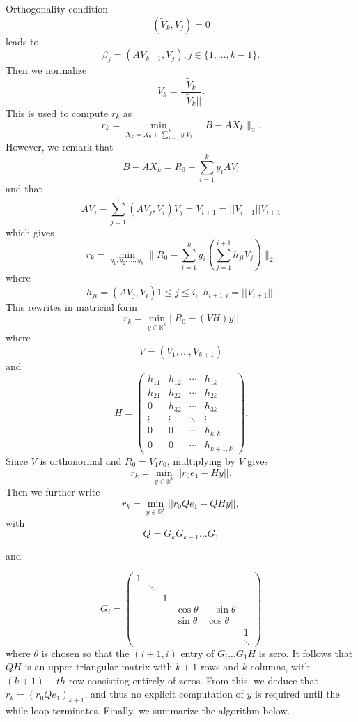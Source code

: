 \documentclass[final,1p,times]{elsarticle}
\newcommand{\R}{\mathbb{R}}
\begin{document}
Orthogonality condition
\[(\tilde{V}_k,V_j)=0\]
leads to
\[\beta_j=(AV_{k-1},V_j), j\in\{1,...,k-1\}.\]
Then we normalize 
\[V_k=\frac{\tilde{V}_k}{||\tilde{V}_k||}.\]
This is used to compute $r_k$ as 
\[r_k = \min_{X_k=X_0+\sum_{i=1}^ky_iV_i} \| B - AX_k \|_2. \]
However, we remark that
\[B - AX_k=R_0-\sum_{i=1}^ky_iAV_i\]
and that
\[AV_i-\sum_{j=1}^i(AV_j,V_i)V_j=\tilde{V}_{i+1}=||\tilde{V}_{i+1}||V_{i+1}\]
which gives
\[r_k=\min_{y_1,y_2,...,y_k}\| R_0 - \sum_{i=1}^ky_i(\sum_{j=1}^{i+1}h_{ji}V_j) \|_2\]
where
\[h_{ji}=(AV_j,V_i) 1\leq j\leq i,\,\,h_{i+1,i}=||\tilde{V}_{i+1}||.\]
This rewrites in matricial form
\[r_k=\min_{y\in \R^k}||R_0-(VH)y||\]
where
\[V=(V_1,...,V_{k+1})\]
and
\[H=\begin{pmatrix}
h_{11} & h_{12} & \cdots & h_{1k} \\
h_{21} & h_{22} & \cdots & h_{2k} \\
0      & h_{32} & \cdots & h_{3k} \\
\vdots & \vdots & \ddots & \vdots \\
0      & 0      & \cdots & h_{k,k} \\
0      & 0      & \cdots & h_{k+1,k}
\end{pmatrix}.
\]
Since $V$ is orthonormal and $R_0=V_1r_0$, multiplying by $V$ gives
\[r_k=\min_{y\in \R^k}||r_0e_1-Hy||.\]
Then we further write
\[r_k=\min_{y\in \R^k}||r_0Qe_1-QHy||,\]
with
\[Q=G_kG_{k-1}...G_1\]

and

\[
G_{i}=
\begin{pmatrix}
1 &        &        &        &        &        \\
  & \ddots &        &        &        &        \\
  &        & 1      &        &        &        \\
  &        &        & \cos\theta & -\sin\theta &        \\
  &        &        & \sin\theta & \cos\theta  &        \\
  &        &        &        &        & 1      \\
  &        &        &        &        &        \ddots
\end{pmatrix}
\]
where $\theta$ is chosen so that the  $(i+1,i)$ entry of  $G_i...G_1H$ is zero. It follows that $QH$ is an upper triangular matrix with $k+1$ rows and $k$ columns, with $(k+1)-th$ row consisting entirely of zeros. From this,  we deduce that $r_k=(r_0Qe_1)_{k+1}$, and thus no explicit computation of $y$ is required until the while loop terminates. Finally, we summarize the algorithm below.
\end{document}
